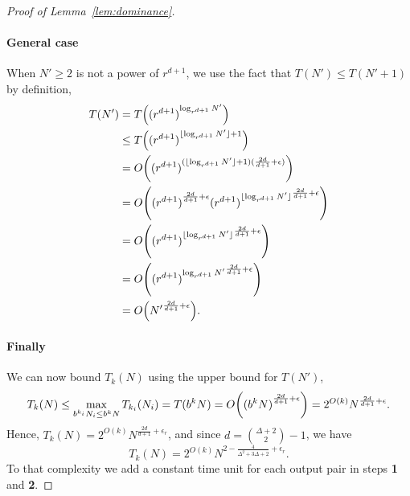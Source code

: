 \begin{proof}[Proof of Lemma~\ref{lem:dominance}]
\paragraph{General case}
When $N' \ge 2$ is not a power of $r^{d+1}$, we use the fact that
$T(N') \le T(N'+1)$ by definition,
\begin{align*}
	T(N')
	&=
	T\mleft({(r^{d+1})}^{\log_{r^{d+1}} N'}\mright)
	\\
	&\le
	T\mleft({(r^{d+1})}^{\lfloor\log_{r^{d+1}} N'\rfloor + 1}\mright)
	\\
	&=
	O\mleft({(r^{d+1})}^{(\lfloor\log_{r^{d+1}} N'\rfloor + 1
	)(\frac{2d}{d+1}+\epsilon)}\mright)
	\\
	&=
	O\mleft({(r^{d+1})}^{\frac{2d}{d+1}+\epsilon}
	{{(r^{d+1})}^{\lfloor\log_{r^{d+1}} N'\rfloor}}^{\frac{2d}{d+1}+\epsilon}\mright)
	\\
	&=
	O\mleft({{(r^{d+1})}^{\lfloor\log_{r^{d+1}}
	N'\rfloor}}^{\frac{2d}{d+1}+\epsilon}\mright)
	\\
	&=
	O\mleft({{(r^{d+1})}^{\log_{r^{d+1}}
	N'}}^{\frac{2d}{d+1}+\epsilon}\mright)
	\\
	&=
	O\mleft({N'}^{\frac{2d}{d+1}+\epsilon}\mright).
\end{align*}
\paragraph{Finally} We can now bound $T_k(N)$ using the upper bound for
$T(N')$,
\begin{displaymath}
	T_{k}(N)
	\le
	\max_{b^{k_i} N_i \le b^{k} N} T_{k_i}(N_i)
	=
	T(b^{k} N)
	=
	O\mleft({(b^{k} N)}^{\frac{2d}{d+1}+\epsilon}\mright)
	=
	2^{O(k)}{N}^{\frac{2d}{d+1}+\epsilon}.
\end{displaymath}
Hence,
$T_k(N) = 2^{O(k)}N^{\frac{2d}{d+1}+\epsilon_r}$,
and since $d=\binom{\Delta+2}{2}-1$, we have
\begin{displaymath}
	T_k(N) = 2^{O(k)}N^{2-\frac{4}{{\Delta}^2+3\Delta+2}+\epsilon_r}.
\end{displaymath}
To that complexity we add a constant time unit for each output
pair in steps \textbf{1} and \textbf{2}.
\end{proof}

